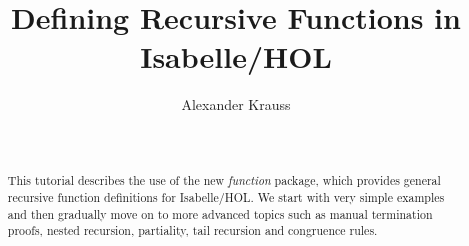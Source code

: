 \documentclass[a4paper,fleqn]{article}
\title{Defining Recursive Functions in Isabelle/HOL}
\author{Alexander Krauss}
\begin{document}
\date{\ \\}
\maketitle

\begin{abstract}
  This tutorial describes the use of the new \emph{function} package,
	which provides general recursive function definitions for Isabelle/HOL.
	We start with very simple examples and then gradually move on to more
	advanced topics such as manual termination proofs, nested recursion,
	partiality, tail recursion and congruence rules.
\end{abstract}





%

\begingroup
 \small\raggedright\frenchspacing

\endgroup
\end{document}
